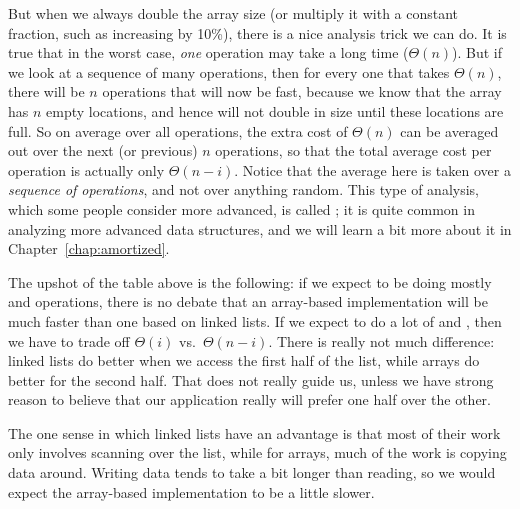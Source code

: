 But when we always double the array size (or multiply it with a
constant fraction, such as increasing by 10\%),
there is a nice analysis trick we can do. 
It is true that in the worst case, \emph{one}  operation
may take a long time ($\Theta(n)$).
But if we look at a sequence of many  operations,
then for every one that takes $\Theta(n)$, there will be $n$
operations that will now be fast, 
because we know that the array has $n$ empty locations,
and hence will not double in size until these locations are full. 
So on average over all operations, the extra cost of $\Theta(n)$ can
be averaged out over the next (or previous) $n$ operations, so that
the total average cost per operation is actually only $\Theta(n-i)$.
Notice that the average here is taken over a
\emph{sequence of operations}, and not over anything random.
This type of analysis, which some people consider more advanced, is
called ; it is quite common in analyzing
more advanced data structures,
and we will learn a bit more about it in Chapter~\ref{chap:amortized}.

\medskip

The upshot of the table above is the following:
if we expect to be doing mostly  and 
operations, there is no debate that an array-based implementation will
be much faster than one based on linked lists.
If we expect to do a lot of  and , then we
have to trade off $\Theta(i)$ vs.~$\Theta(n-i)$.
There is really not much difference:
linked lists do better when we access the first half of the list,
while arrays do better for the second half.
That does not really guide us, unless we have strong reason to believe
that our application really will prefer one half over the other.

The one sense in which linked lists have an advantage is that most of
their work only involves scanning over the list, while for arrays,
much of the work is copying data around.
Writing data tends to take a bit longer than reading,
so we would expect the array-based implementation to be a little slower.
